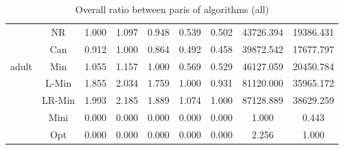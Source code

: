 \documentclass[11pt]{book}
\begin{document}
\begin{table}
\begin{tabular}{|c|c|c|c|c|c|c|c|c|}
    \hline
    \multirow{5}{*}{adult}
         & NR & 1.000 & 1.097 & 0.948 & 0.539 & 0.502 & 43726.394 & 19386.431 \\                                                                                                                                     
         & Can & 0.912 & 1.000 & 0.864 & 0.492 & 0.458 & 39872.542 & 17677.797 \\                                                                                                                                    
         & Min & 1.055 & 1.157 & 1.000 & 0.569 & 0.529 & 46127.059 & 20450.784 \\                                                                                                                                    
         & L-Min & 1.855 & 2.034 & 1.759 & 1.000 & 0.931 & 81120.000 & 35965.172 \\                                                                                                                                  
         & LR-Min & 1.993 & 2.185 & 1.889 & 1.074 & 1.000 & 87128.889 & 38629.259 \\                                                                                                                                 
         & Mini & 0.000 & 0.000 & 0.000 & 0.000 & 0.000 & 1.000 & 0.443 \\                                                                                                                                           
         & Opt & 0.000 & 0.000 & 0.000 & 0.000 & 0.000 & 2.256 & 1.000 \\
    	
    \hline

    
\end{tabular}

	\caption{Overall ratio between paris of algorithms (all)}

\end{table}
\end{document}
